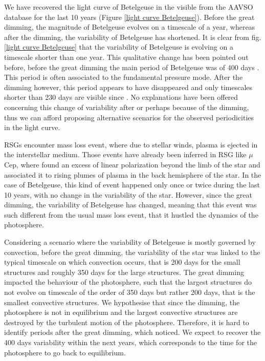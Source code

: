 \documentclass{aa}
\begin{document}
We have recovered the light curve of Betelgeuse in the visible from the AAVSO database for the last 10 years (Figure \ref{light curve Betelgeuse}).
Before the great dimming, the magnitude of Betelgeuse evolves on a timescale of a year, whereas after the dimming, the variability of Betelgeuse has shortened. 
It is clear from fig. \ref{light curve Betelgeuse} that the 
variability of Betelgeuse is evolving on a timescale shorter than one year. This qualitative change has been pointed out before,
before the great dimming the main period of Betelgeuse was of 400 days \citep{kiss_variability_2006}. 
This period is often associated to the fundamental pressure mode. After the dimming however, this period appears to have disappeared 
and only timescales shorter than 230 days are visible since \citep{dupree_great_2022}. 
No explanations have been offered concerning this change of variability after or perhaps because of the dimming, thus we can afford proposing alternative scenarios for the observed periodicities in the light curve. \

RSGs encounter mass loss event, where due to stellar winds, plasma is ejected in the interstellar medium. Those events have already been inferred in RSG like $\mu$Cep, where \cite{lopez_ariste_height_2023} found an excess of linear polarization beyond the limb of the star and associated it to rising plumes of plasma in the back hemisphere of the star. In the case of Betelgeuse, this kind of event happened only once or twice during the last 10 years, with no change in the variability of the star. However, since the great dimming, the variability of Betelgeuse has changed, meaning that this event was such different from the usual mass loss event, that it hustled the dynamics of the photosphere. \

Considering a scenario where the variability of Betelgeuse is mostly governed by convection, before the great dimming, the variability of the star was linked to the typical timescale on which convection occurs, that is 200 days for the small structures and roughly 350 days for the large structures. The great dimming impacted the behaviour of the photosphere, such that the largest structures do not evolve on timescale of the order of 350 days but rather 200 days, that is the smallest convective structures. We hypothesise that since the dimming, the photosphere is not in equilibrium and the largest convective structures are destroyed by the turbulent motion of the photosphere. Therefore, it is hard to identify periods after the great dimming, which \cite{dupree_great_2022} noticed. We expect to recover the 400 days variability within the next years, which corresponds to the time for the photosphere to go back to equilibrium.  
\end{document}
